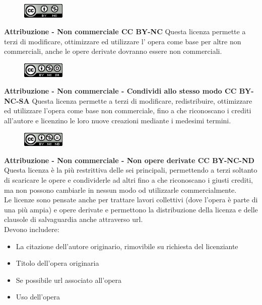\begin{figure}
    \includegraphics[width=20mm]{images/cc_by_nc}
\end{figure}

\noindent \textbf{Attribuzione - Non commerciale CC BY-NC} Questa licenza permette a terzi di modificare, ottimizzare ed utilizzare l' opera come base per altre non commerciali, anche le opere derivate dovranno essere non commerciali.\\

\begin{figure}
    \includegraphics[width=20mm]{images/cc_by_nc_sa}
\end{figure}

\noindent \textbf{Attribuzione - Non commerciale - Condividi allo stesso modo CC BY-NC-SA} Questa licenza permette a terzi di modificare, redistribuire, ottimizzare ed utilizzare l'opera come base non commerciale, fino a che riconoscano i crediti all'autore e licenzino le loro nuove creazioni mediante i medesimi termini.\\

\begin{figure}
    \includegraphics[width=20mm]{images/cc_by_nc_nd}
\end{figure}

\noindent \textbf{Attribuzione - Non commerciale - Non opere derivate 
CC BY-NC-ND} Questa licenza è la più restrittiva delle sei principali, permettendo a terzi soltanto di scaricare le opere e condividerle ad altri fino a che riconoscano i giusti crediti, ma non possono cambiarle in nessun modo od utilizzarle commercialmente.\\

Le licenze sono pensate anche per trattare lavori collettivi (dove l'opera è parte di una più ampia) e opere derivate e permettono la distribuzione della licenza e delle clausole di salvaguardia anche attraverso url.\\

Devono includere:
\begin{itemize}
\item La citazione dell'autore originario, rimovibile su richiesta del licenziante
\item Titolo dell'opera originaria
\item Se possibile url associato all'opera
\item Uso dell'opera
\end{itemize}

